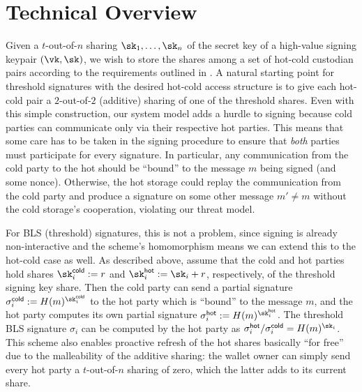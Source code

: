 \section{Technical Overview}

Given a $t$-out-of-$n$ sharing $\sk_1, \dots, \sk_n$ of the secret key of a high-value signing keypair $(\vk, \sk)$, we wish to store the shares among a set of hot-cold custodian pairs according to the requirements outlined in . A natural starting point for threshold signatures with the desired hot-cold access structure is to give each hot-cold pair a $2$-out-of-$2$ (additive) sharing of one of the threshold shares.
Even with this simple construction, our system model adds a hurdle to signing because cold parties can communicate only via their respective hot parties. This means that some care has to be taken in the signing procedure to ensure that \emph{both} parties must participate for every signature. In particular, any communication from the cold party to the hot should be ``bound'' to the message $m$ being signed (and some nonce). Otherwise, the hot storage could replay the communication from the cold party and produce a signature on some other message $m' \neq m$ without the cold storage's cooperation, violating our threat model.

For BLS (threshold) signatures, this is not a problem, since signing is already non-interactive and the scheme's homomorphism means we can extend this to the hot-cold case as well.
As described above, assume that the cold and hot parties hold shares $\sk_i^\cold := r$ and $\sk_i^\hot := \sk_i+r$, respectively, of the threshold signing key share. Then the cold party can send a partial signature $\sigma_i^\cold := \blshash(m)^{\sk_i^\cold}$ to the hot party which is ``bound'' to the message $m$, and the hot party computes its own partial signature $\sigma_i^\hot := \blshash(m)^{\sk_i^\hot}$. The threshold BLS signature $\sigma_i$ can be computed by the hot party as $\sigma_i^\hot/\sigma_i^\cold = \blshash(m)^{\sk_i}$. This scheme also enables proactive refresh of the hot shares basically ``for free'' due to the malleability of the additive sharing: the wallet owner can simply send every hot party a $t$-out-of-$n$ sharing of zero, which the latter adds to its current share. 

